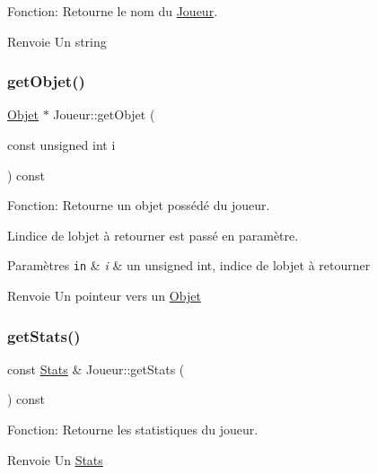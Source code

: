 Fonction\+: Retourne le nom du \mbox{\hyperlink{classJoueur}{Joueur}}. 

\begin{DoxyReturn}{Renvoie}
Un string 
\end{DoxyReturn}
\mbox{\label{classJoueur_ac9530c324c6dff323138e00b933eb448}} 
\subsubsection{\texorpdfstring{get\+Objet()}{getObjet()}}
{\footnotesize\ttfamily \mbox{\hyperlink{structObjet}{Objet}} $\ast$ Joueur\+::get\+Objet (\begin{DoxyParamCaption}\item[{const unsigned int}]{i }\end{DoxyParamCaption}) const}



Fonction\+: Retourne un objet possédé du joueur. 

L\textquotesingle{}indice de l\textquotesingle{}objet à retourner est passé en paramètre. 
\begin{DoxyParams}[1]{Paramètres}
\mbox{\tt in}  & {\em i} & un unsigned int, indice de l\textquotesingle{}objet à retourner \\
\hline
\end{DoxyParams}
\begin{DoxyReturn}{Renvoie}
Un pointeur vers un \mbox{\hyperlink{structObjet}{Objet}} 
\end{DoxyReturn}
\mbox{\label{classJoueur_af606e8696fe13a8d974fa82807b13c61}} 
\subsubsection{\texorpdfstring{get\+Stats()}{getStats()}}
{\footnotesize\ttfamily const \mbox{\hyperlink{structStats}{Stats}} \& Joueur\+::get\+Stats (\begin{DoxyParamCaption}{ }\end{DoxyParamCaption}) const}



Fonction\+: Retourne les statistiques du joueur. 

\begin{DoxyReturn}{Renvoie}
Un \mbox{\hyperlink{structStats}{Stats}} 
\end{DoxyReturn}
\mbox{\label{classJoueur_a07800b7930b339f789a4e0d9a9ef220f}} 
